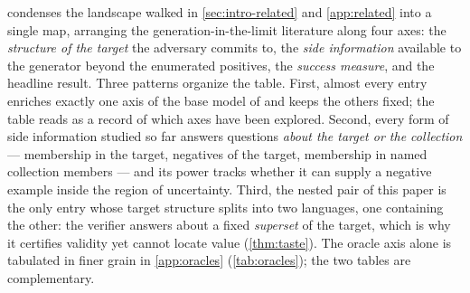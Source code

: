 \documentclass[11pt]{article}
\numberwithin{equation}{section}
\theoremstyle{plain}
\theoremstyle{definition}
\theoremstyle{remark}
\begin{document}
 condenses the landscape walked in \cref{sec:intro-related} and
\cref{app:related} into a single map, arranging the generation-in-the-limit literature along
four axes: the \emph{structure of the target} the adversary commits to, the \emph{side
information} available to the generator beyond the enumerated positives, the \emph{success
measure}, and the headline result. Three patterns organize the table. First, almost every
entry enriches exactly one axis of the base model of \citet{kleinberg2024language} and keeps
the others fixed; the table reads as a record of which axes have been explored. Second,
every form of side information studied so far answers questions \emph{about the target or
the collection} --- membership in the target, negatives of the target, membership in named
collection members --- and its power tracks whether it can supply a negative example inside
the region of uncertainty. Third, the nested pair of this paper is the only entry whose
target structure splits into two languages, one containing the other: the verifier answers
about a fixed \emph{superset} of the target, which is why it certifies validity yet cannot
locate value (\cref{thm:taste}). The oracle axis alone is tabulated in finer grain in
\cref{app:oracles} (\cref{tab:oracles}); the two tables are complementary.
\end{document}
